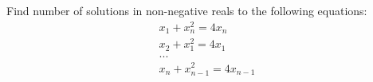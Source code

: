 Find number of solutions in non-negative reals to the following equations:
\begin{eqnarray*}x_1 + x_n ^2 = 4x_n \\ x_2 + x_1 ^2 = 4x_1 \\ ... \\ x_n + x_{n-1}^2 = 4x_{n-1} \end{eqnarray*}